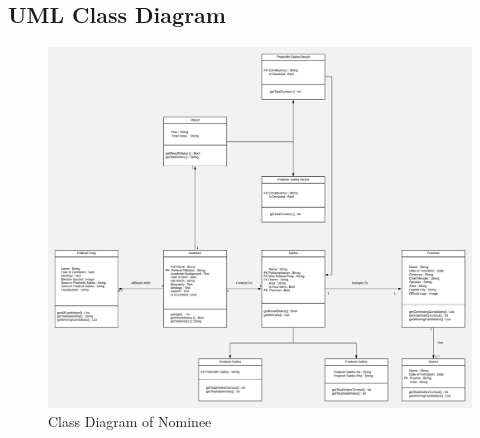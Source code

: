 \documentclass[12pt, a4paper, titlepage]{article}
\begin{document}
\subsection{UML Class Diagram}
\begin{center}
\begin{figure}[ht]
	\includegraphics[scale=0.4]{Class_Diagram_for_Election_Portal_1.png}
	\caption{Class Diagram of Nominee}
\end{figure}
\end{center}
\end{document}
